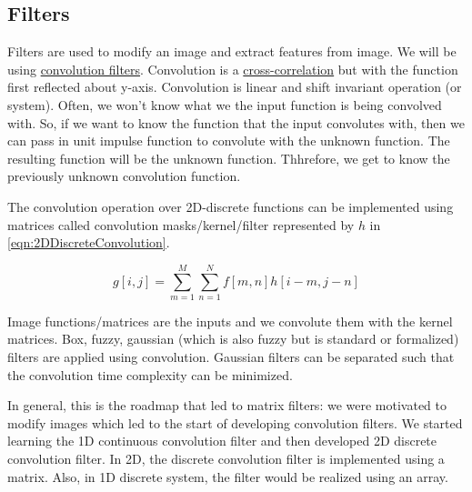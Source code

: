 \documentclass{report}
\begin{document}
\subsection{Filters}
\hspace{\parindent}Filters are used to modify an image and extract features from image. We will be using \href{https://www.youtube.com/watch?v=ctn4MKATJOs&t=3s}{convolution filters}. Convolution is a \href{https://www.youtube.com/watch?v=Ma0YONjMZLI}{cross-correlation} but with the function first reflected about y-axis. Convolution is linear and shift invariant operation (or system). Often, we won't know what we the input function is being convolved with. So, if we want to know the function that the input convolutes with, then we can pass in unit impulse function to convolute with the unknown function. The resulting function will be the unknown function. Thhrefore, we get to know the previously unknown convolution function.

The convolution operation over 2D-discrete functions can be implemented using matrices called convolution masks/kernel/filter represented by $h$ in \ref{eqn:2DDiscreteConvolution}.

\begin{equation}
g[i,j]=\sum_{m=1} ^{M}\sum_{n=1} ^{N} f[m,n]h[i-m, j-n]
\label{eqn:2DDiscreteConvolution}
\end{equation}

Image functions/matrices are the inputs and we convolute them with the kernel matrices. Box, fuzzy, gaussian (which is also fuzzy but is standard or formalized) filters are applied using convolution. Gaussian filters can be separated such that the convolution time complexity can be minimized.

In general, this is the roadmap that led to matrix filters: we were motivated to modify images which led to the start of developing convolution filters. We started learning the 1D continuous convolution filter and then developed 2D discrete convolution filter. In 2D, the discrete convolution filter is implemented using a matrix. Also, in 1D discrete system, the filter would be realized using an array.

\end{document}
